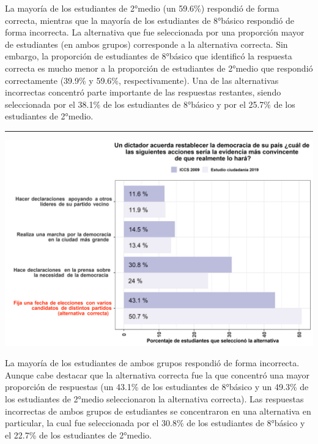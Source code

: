 \documentclass[
  14pt,
]{book}
\let\origfigure\figure
\let\endorigfigure\endfigure
\renewenvironment{figure}[1][2] {
  \expandafter\origfigure\expandafter[H]
} {
  \endorigfigure
}
\begin{document}
La mayoría de los estudiantes de 2°medio (un 59.6\%) respondió de forma correcta, mientras que la mayoría de los estudiantes de 8°básico respondió de forma incorrecta. La alternativa que fue seleccionada por una proporción mayor de estudiantes (en ambos grupos) corresponde a la alternativa correcta. Sin embargo, la proporción de estudiantes de 8°básico que identificó la respuesta correcta es mucho menor a la proporción de estudiantes de 2°medio que respondió correctamente (39.9\% y 59.6\%, respectivamente). Una de las alternativas incorrectas concentró parte importante de las respuestas restantes, siendo seleccionada por el 38.1\% de los estudiantes de 8°básico y por el 25.7\% de los estudiantes de 2°medio.

\begin{center}\rule{0.5\linewidth}{0.5pt}\end{center}

\begin{figure}[!ht]

{\centering \includegraphics[width=0.8\linewidth,]{images/graph_p5} 

}

\caption{Comparación con ICCS: Acción que demuestra que un dictador restablecerá la democracia}\label{fig:unnamed-chunk-23}
\end{figure}

La mayoría de los estudiantes de ambos grupos respondió de forma incorrecta. Aunque cabe destacar que la alternativa correcta fue la que concentró una mayor proporción de respuestas (un 43.1\% de los estudiantes de 8°básico y un 49.3\% de los estudiantes de 2°medio seleccionaron la alternativa correcta). Las respuestas incorrectas de ambos grupos de estudiantes se concentraron en una alternativa en particular, la cual fue seleccionada por el 30.8\% de los estudiantes de 8°básico y el 22.7\% de los estudiantes de 2°medio.
\end{document}
